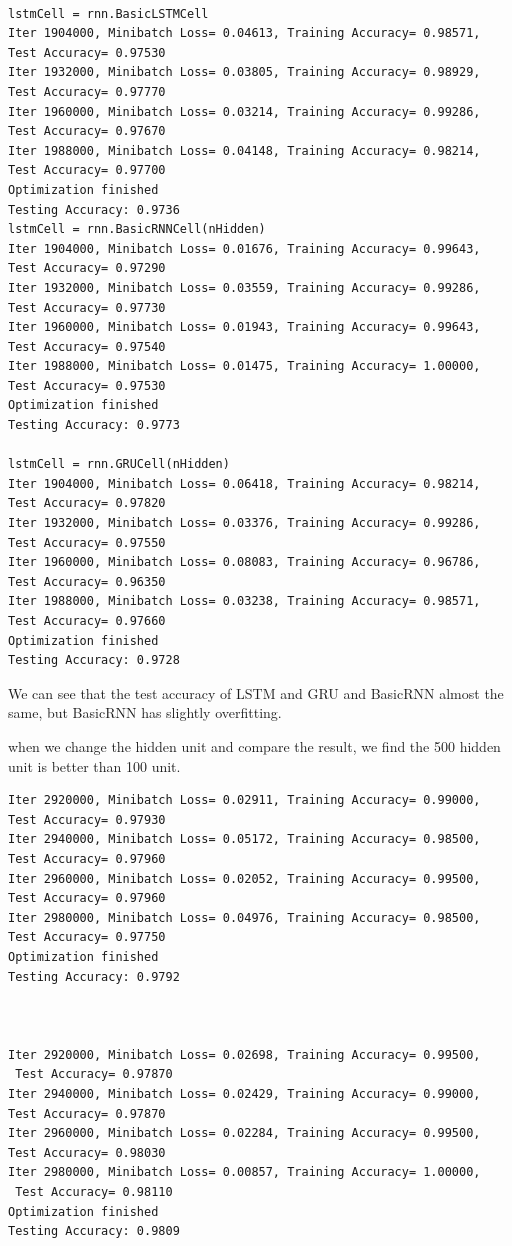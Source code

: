 \documentclass[12pt]{article}
\begin{document}
\begin{lstlisting}

lstmCell = rnn.BasicLSTMCell
Iter 1904000, Minibatch Loss= 0.04613, Training Accuracy= 0.98571, 
Test Accuracy= 0.97530
Iter 1932000, Minibatch Loss= 0.03805, Training Accuracy= 0.98929, 
Test Accuracy= 0.97770
Iter 1960000, Minibatch Loss= 0.03214, Training Accuracy= 0.99286, 
Test Accuracy= 0.97670
Iter 1988000, Minibatch Loss= 0.04148, Training Accuracy= 0.98214, 
Test Accuracy= 0.97700
Optimization finished
Testing Accuracy: 0.9736
lstmCell = rnn.BasicRNNCell(nHidden)
Iter 1904000, Minibatch Loss= 0.01676, Training Accuracy= 0.99643, 
Test Accuracy= 0.97290
Iter 1932000, Minibatch Loss= 0.03559, Training Accuracy= 0.99286, 
Test Accuracy= 0.97730
Iter 1960000, Minibatch Loss= 0.01943, Training Accuracy= 0.99643, 
Test Accuracy= 0.97540
Iter 1988000, Minibatch Loss= 0.01475, Training Accuracy= 1.00000, 
Test Accuracy= 0.97530
Optimization finished
Testing Accuracy: 0.9773

lstmCell = rnn.GRUCell(nHidden)
Iter 1904000, Minibatch Loss= 0.06418, Training Accuracy= 0.98214, 
Test Accuracy= 0.97820
Iter 1932000, Minibatch Loss= 0.03376, Training Accuracy= 0.99286, 
Test Accuracy= 0.97550
Iter 1960000, Minibatch Loss= 0.08083, Training Accuracy= 0.96786, 
Test Accuracy= 0.96350
Iter 1988000, Minibatch Loss= 0.03238, Training Accuracy= 0.98571, 
Test Accuracy= 0.97660
Optimization finished
Testing Accuracy: 0.9728
\end{lstlisting}
We can see that the test accuracy of LSTM and GRU and BasicRNN almost the same, but BasicRNN has slightly overfitting. 



when we change the hidden unit and compare the result, we find the 500 hidden unit is better than 100 unit.

\begin{lstlisting}
Iter 2920000, Minibatch Loss= 0.02911, Training Accuracy= 0.99000, 
Test Accuracy= 0.97930
Iter 2940000, Minibatch Loss= 0.05172, Training Accuracy= 0.98500, 
Test Accuracy= 0.97960
Iter 2960000, Minibatch Loss= 0.02052, Training Accuracy= 0.99500, 
Test Accuracy= 0.97960
Iter 2980000, Minibatch Loss= 0.04976, Training Accuracy= 0.98500, 
Test Accuracy= 0.97750
Optimization finished
Testing Accuracy: 0.9792



Iter 2920000, Minibatch Loss= 0.02698, Training Accuracy= 0.99500,
 Test Accuracy= 0.97870
Iter 2940000, Minibatch Loss= 0.02429, Training Accuracy= 0.99000, 
Test Accuracy= 0.97870
Iter 2960000, Minibatch Loss= 0.02284, Training Accuracy= 0.99500, 
Test Accuracy= 0.98030
Iter 2980000, Minibatch Loss= 0.00857, Training Accuracy= 1.00000,
 Test Accuracy= 0.98110
Optimization finished
Testing Accuracy: 0.9809
\end{lstlisting}
\end{document}
